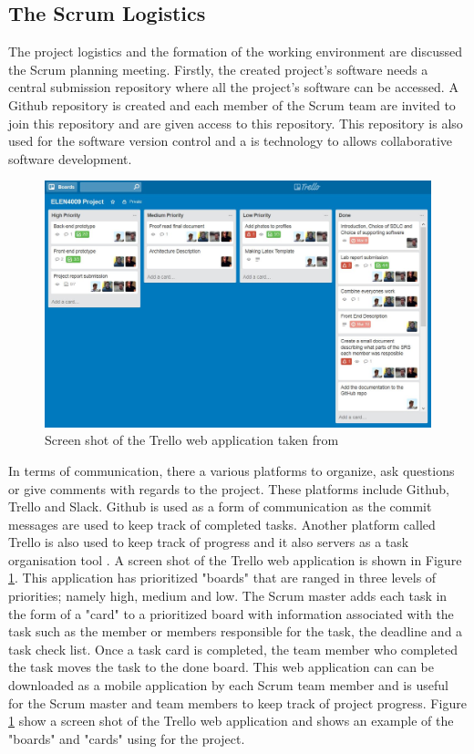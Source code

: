 \documentclass[12pt,onecolumn]{article}
\begin{document}
	\subsection{The Scrum Logistics} \label{log}
	The project logistics and the formation of the working environment are discussed the Scrum planning meeting. Firstly, the created project's software needs a central submission repository where all the project's software can be accessed. A Github repository is created and each member of the Scrum team are invited to join this repository and are given access to this repository. This repository is also used for the software version control and a is technology to allows collaborative software development.
	
	\begin{figure}[h!]
		\centering
		\includegraphics[width=\textwidth]{trello}
		\caption{Screen shot of the Trello web application taken from \cite{trello} }
		\label{trello}
	\end{figure}
	
	In terms of communication, there a various platforms to organize, ask questions or give comments with regards to the project. These platforms include Github, Trello and Slack. Github is used as a form of communication as the commit messages are used to keep track of completed tasks. Another platform called Trello is also used to keep track of progress and it also servers as a task organisation tool \cite{trello}. A screen shot of the Trello web application is shown in Figure \ref{trello}. This application has prioritized "boards" that are ranged in three levels of priorities; namely high, medium and low. The Scrum master adds each task in the form of a "card" to a prioritized board with information associated with the task such as the member or members responsible for the task, the deadline and a task check list. Once a task card is completed, the team member who completed the task moves the task to the done board. This web application can can be downloaded as a mobile application by each Scrum team member and is useful for the Scrum master and team members to keep track of project progress. Figure \ref{trello} show a screen shot of the Trello web application and shows an example of the "boards" and "cards" using for the project.
	
\end{document}
